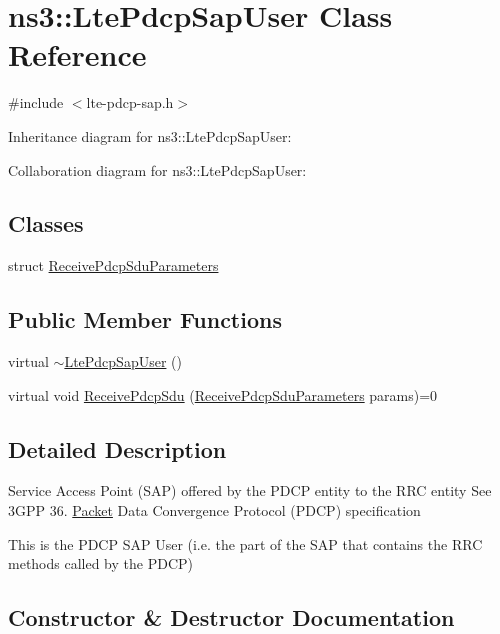 \hypertarget{classns3_1_1LtePdcpSapUser}{}\section{ns3\+:\+:Lte\+Pdcp\+Sap\+User Class Reference}
\label{classns3_1_1LtePdcpSapUser}


{\ttfamily \#include $<$lte-\/pdcp-\/sap.\+h$>$}



Inheritance diagram for ns3\+:\+:Lte\+Pdcp\+Sap\+User\+:


Collaboration diagram for ns3\+:\+:Lte\+Pdcp\+Sap\+User\+:
\subsection*{Classes}
\begin{DoxyCompactItemize}
\item 
struct \hyperlink{structns3_1_1LtePdcpSapUser_1_1ReceivePdcpSduParameters}{Receive\+Pdcp\+Sdu\+Parameters}
\end{DoxyCompactItemize}
\subsection*{Public Member Functions}
\begin{DoxyCompactItemize}
\item 
virtual \hyperlink{classns3_1_1LtePdcpSapUser_aa897256cc90fc2b721241cee2fd87226}{$\sim$\+Lte\+Pdcp\+Sap\+User} ()
\item 
virtual void \hyperlink{classns3_1_1LtePdcpSapUser_a583987f2d64a552a2e5c0d7aa8ac461f}{Receive\+Pdcp\+Sdu} (\hyperlink{structns3_1_1LtePdcpSapUser_1_1ReceivePdcpSduParameters}{Receive\+Pdcp\+Sdu\+Parameters} params)=0
\end{DoxyCompactItemize}


\subsection{Detailed Description}
Service Access Point (S\+AP) offered by the P\+D\+CP entity to the R\+RC entity See 3\+G\+PP 36. \hyperlink{classns3_1_1Packet}{Packet} Data Convergence Protocol (P\+D\+CP) specification

This is the P\+D\+CP S\+AP User (i.\+e. the part of the S\+AP that contains the R\+RC methods called by the P\+D\+CP) 

\subsection{Constructor \& Destructor Documentation}
